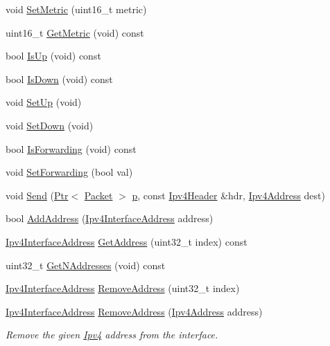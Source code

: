 \begin{DoxyCompactItemize}
\item 
void \hyperlink{classns3_1_1Ipv4Interface_af8e0fdb61952e368366f88573388a3ca}{Set\+Metric} (uint16\+\_\+t metric)
\item 
uint16\+\_\+t \hyperlink{classns3_1_1Ipv4Interface_adb231f3184df27169cc82368f9cf3184}{Get\+Metric} (void) const 
\item 
bool \hyperlink{classns3_1_1Ipv4Interface_a94515cf6d2cf61657196e84ce50c16ce}{Is\+Up} (void) const 
\item 
bool \hyperlink{classns3_1_1Ipv4Interface_a70cd584bff3e62b36f4820d5421479c8}{Is\+Down} (void) const 
\item 
void \hyperlink{classns3_1_1Ipv4Interface_a300d93f5611c7348d90613a95beb7dc9}{Set\+Up} (void)
\item 
void \hyperlink{classns3_1_1Ipv4Interface_adad4814012f229b02500f25928cf3bda}{Set\+Down} (void)
\item 
bool \hyperlink{classns3_1_1Ipv4Interface_a34964d417fa0a43f31e478ca042c5386}{Is\+Forwarding} (void) const 
\item 
void \hyperlink{classns3_1_1Ipv4Interface_af432899ba662d443a92dbec63b187f3f}{Set\+Forwarding} (bool val)
\item 
void \hyperlink{classns3_1_1Ipv4Interface_ace287f60f109cb8bdae73b99e0e9adf5}{Send} (\hyperlink{classns3_1_1Ptr}{Ptr}$<$ \hyperlink{classns3_1_1Packet}{Packet} $>$ \hyperlink{lte__link__budget__x2__handover__measures_8m_ac9de518908a968428863f829398a4e62}{p}, const \hyperlink{classns3_1_1Ipv4Header}{Ipv4\+Header} \&hdr, \hyperlink{classns3_1_1Ipv4Address}{Ipv4\+Address} dest)
\item 
bool \hyperlink{classns3_1_1Ipv4Interface_a44a8a9b61af013d8e1db9387aa51137e}{Add\+Address} (\hyperlink{classns3_1_1Ipv4InterfaceAddress}{Ipv4\+Interface\+Address} address)
\item 
\hyperlink{classns3_1_1Ipv4InterfaceAddress}{Ipv4\+Interface\+Address} \hyperlink{classns3_1_1Ipv4Interface_abba62d5d6da8be995e888ed669760328}{Get\+Address} (uint32\+\_\+t index) const 
\item 
uint32\+\_\+t \hyperlink{classns3_1_1Ipv4Interface_a5c6f11f29082c4d37eaafbd12be2cca4}{Get\+N\+Addresses} (void) const 
\item 
\hyperlink{classns3_1_1Ipv4InterfaceAddress}{Ipv4\+Interface\+Address} \hyperlink{classns3_1_1Ipv4Interface_af94131d7e8ad85739a81be4931555b34}{Remove\+Address} (uint32\+\_\+t index)
\item 
\hyperlink{classns3_1_1Ipv4InterfaceAddress}{Ipv4\+Interface\+Address} \hyperlink{classns3_1_1Ipv4Interface_a9add285ee7158beccf60b765c396755d}{Remove\+Address} (\hyperlink{classns3_1_1Ipv4Address}{Ipv4\+Address} address)
\begin{DoxyCompactList}\small\item\em Remove the given \hyperlink{classns3_1_1Ipv4}{Ipv4} address from the interface. \end{DoxyCompactList}\end{DoxyCompactItemize}
